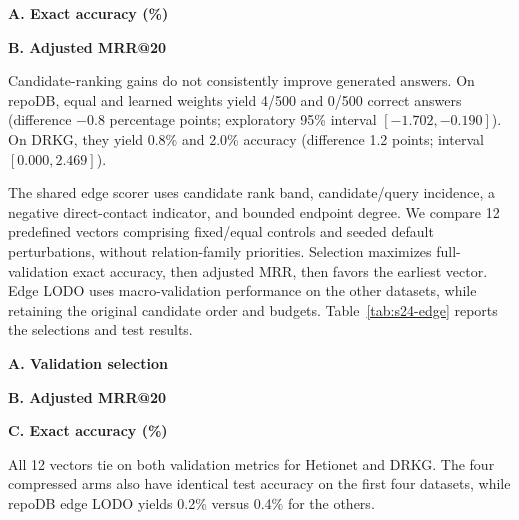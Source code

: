 \begin{revisionblock}
\par{}\noindent\begin{minipage}{\linewidth}

\centering\small
{}
\label{tab:s23-generation}
\textbf{A. Exact accuracy (\%)}\par\smallskip
\par\medskip
\textbf{B. Adjusted MRR@20}\par\smallskip


\end{minipage}\par\medskip

Candidate-ranking gains do not consistently improve generated answers. On repoDB, equal and learned weights yield 4/500 and 0/500 correct answers (difference $-0.8$ percentage points; exploratory 95\% interval $[-1.702,-0.190]$). On DRKG, they yield 0.8\% and 2.0\% accuracy (difference 1.2 points; interval $[0.000,2.469]$).

The shared edge scorer uses candidate rank band, candidate/query incidence, a negative direct-contact indicator, and bounded endpoint degree. We compare 12 predefined vectors comprising fixed/equal controls and seeded default perturbations, without relation-family priorities. Selection maximizes full-validation exact accuracy, then adjusted MRR, then favors the earliest vector. Edge LODO uses macro-validation performance on the other datasets, while retaining the original candidate order and budgets. Table~\ref{tab:s24-edge} reports the selections and test results.

\par{}\noindent\begin{minipage}{\linewidth}

\centering\small
{}
\label{tab:s24-edge}
\textbf{A. Validation selection}\par\smallskip
\par\medskip
\textbf{B. Adjusted MRR@20}\par\smallskip
\par\medskip
\textbf{C. Exact accuracy (\%)}\par\smallskip


\end{minipage}\par\medskip

All 12 vectors tie on both validation metrics for Hetionet and DRKG. The four compressed arms also have identical test accuracy on the first four datasets, while repoDB edge LODO yields 0.2\% versus 0.4\% for the others.
\end{revisionblock}
